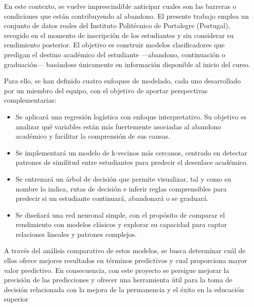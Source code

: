\documentclass{report}[14pt]
\begin{document}
En este contexto, se vuelve imprescindible anticipar cuales son las barreras o condiciones que están contribuyendo al abandono. El presente trabajo emplea un conjunto de datos reales del Instituto Politécnico de Portalegre (Portugal), recogido en el momento de inscripción de los estudiantes y sin considerar su rendimiento posterior. El objetivo es construir modelos clasificadores que predigan el destino académico del estudiante —abandono, continuación o graduación— basándose únicamente en información disponible al inicio del curso. 

Para ello, se han definido cuatro enfoques de modelado, cada uno desarrollado por un miembro del equipo, con el objetivo de aportar perspectivas complementarias:

\begin{itemize}
    \item Se aplicará una regresión logística con enfoque interpretativo. Su objetivo es analizar qué variables están más fuertemente asociadas al abandono académico y facilitar la comprensión de sus causas.
    \item Se implementará un modelo de k-vecinos más cercanos, centrado en detectar patrones de similitud entre estudiantes para predecir el desenlace académico.
    \item Se entrenará un árbol de decisión que permite visualizar, tal y como su nombre lo indica, rutas de decisión e inferir reglas comprensibles para predecir si un estudiante continuará, abandonará o se graduará.
    \item Se diseñará una red neuronal simple, con el propósito de comparar el rendimiento con modelos clásicos y explorar su capacidad para captar relaciones lineales y patrones complejos.
\end{itemize}
 
A través del análisis comparativo de estos modelos, se busca determinar cuál de ellos ofrece mejores resultados en términos predictivos y cual proporciona mayor valor predictivo.  En consecuencia, con este proyecto se persigue mejorar la precisión de las predicciones y ofrecer una herramienta útil para la toma de decisión relacionada con la mejora de la permanencia y el éxito en la educación superior
\end{document}
